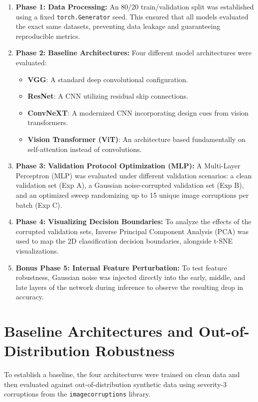 \documentclass[12pt,a4paper]{article}
\begin{document}
\begin{enumerate}
    \item \textbf{Phase 1: Data Processing:} An 80/20 train/validation split was established using a fixed \texttt{torch.Generator} seed. This ensured that all models evaluated the exact same datasets, preventing data leakage and guaranteeing reproducible metrics.
    \item \textbf{Phase 2: Baseline Architectures:} Four different model architectures were evaluated:
    \begin{itemize}
        \item \textbf{VGG}: A standard deep convolutional configuration.
        \item \textbf{ResNet}: A CNN utilizing residual skip connections.
        \item \textbf{ConvNeXT}: A modernized CNN incorporating design cues from vision transformers.
        \item \textbf{Vision Transformer (ViT)}: An architecture based fundamentally on self-attention instead of convolutions.
    \end{itemize}
    \item \textbf{Phase 3: Validation Protocol Optimization (MLP):} A Multi-Layer Perceptron (MLP) was evaluated under different validation scenarios: a clean validation set (Exp A), a Gaussian noise-corrupted validation set (Exp B), and an optimized sweep randomizing up to 15 unique image corruptions per batch (Exp C).
    \item \textbf{Phase 4: Visualizing Decision Boundaries:} To analyze the effects of the corrupted validation sets, Inverse Principal Component Analysis (PCA) was used to map the 2D classification decision boundaries, alongside t-SNE visualizations.
    \item \textbf{Bonus Phase 5: Internal Feature Perturbation:} To test feature robustness, Gaussian noise was injected directly into the early, middle, and late layers of the network during inference to observe the resulting drop in accuracy.
\end{enumerate}

\newpage
\section{Baseline Architectures and Out-of-Distribution Robustness}
To establish a baseline, the four architectures were trained on clean data and then evaluated against out-of-distribution synthetic data using severity-3 corruptions from the \texttt{imagecorruptions} library.
\end{document}

